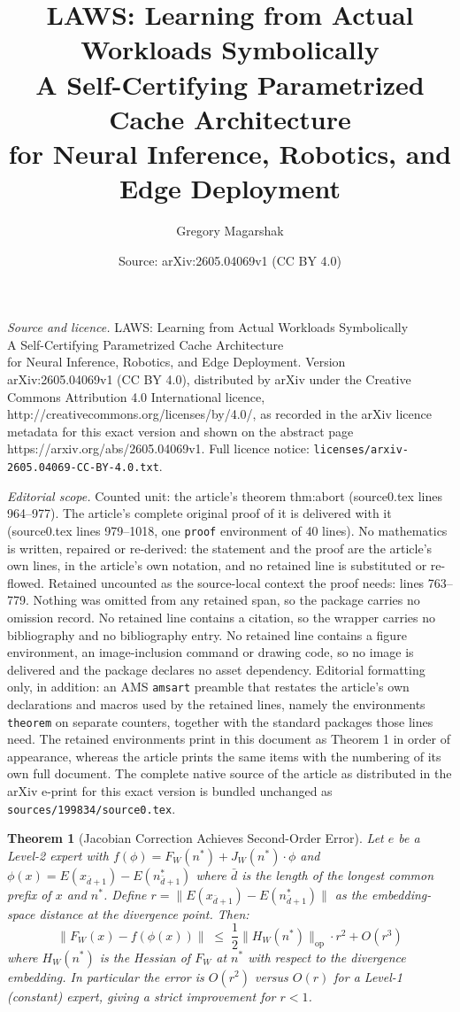 \documentclass[10pt,a4paper]{amsart}
\title{LAWS: Learning from Actual Workloads Symbolically\\ \large A Self-Certifying Parametrized Cache Architecture\\ for Neural Inference, Robotics, and Edge Deployment}
\author{Gregory Magarshak}
\date{Source: arXiv:2605.04069v1 (CC BY 4.0)}
\newtheorem{theorem}{Theorem}
\begin{document}
\maketitle

\noindent\emph{Source and licence.} LAWS: Learning from Actual Workloads Symbolically\\ \large A Self-Certifying Parametrized Cache Architecture\\ for Neural Inference, Robotics, and Edge Deployment. Version arXiv:2605.04069v1 (CC BY 4.0), distributed by arXiv under the Creative Commons Attribution 4.0 International licence, http://creativecommons.org/licenses/by/4.0/, as recorded in the arXiv licence metadata for this exact version and shown on the abstract page https://arxiv.org/abs/2605.04069v1. Full licence notice: \texttt{licenses/arxiv-2605.04069-CC-BY-4.0.txt}.\par\smallskip

\noindent\textit{Editorial scope.} Counted unit: the article's theorem thm:abort (source0.tex lines 964--977). The article's complete original proof of it is delivered with it (source0.tex lines 979--1018, one \texttt{proof} environment of 40 lines). No mathematics is written, repaired or re-derived: the statement and the proof are the article's own lines, in the article's own notation, and no retained line is substituted or re-flowed.  Retained uncounted as the source-local context the proof needs: lines 763--779.  Nothing was omitted from any retained span, so the package carries no omission record.  No retained line contains a citation, so the wrapper carries no bibliography and no bibliography entry.  No retained line contains a figure environment, an image-inclusion command or drawing code, so no image is delivered and the package declares no asset dependency.  Editorial formatting only, in addition: an AMS \texttt{amsart} preamble that restates the article's own declarations and macros used by the retained lines, namely the environments \texttt{theorem} on separate counters, together with the standard packages those lines need.  The retained environments print in this document as Theorem 1 in order of appearance, whereas the article prints the same items with the numbering of its own full document.  The complete native source of the article as distributed in the arXiv e-print for this exact version is bundled unchanged as \texttt{sources/199834/source0.tex}.
\begin{theorem}[Jacobian Correction Achieves Second-Order Error]
\label{thm:jacobian}
Let $e$ be a Level-2 expert with $f(\phi) = F_W(n^*) + J_W(n^*) \cdot \phi$
and $\phi(x) = E(x_{\bar{d}+1}) - E(n^*_{\bar{d}+1})$ where $\bar{d}$ is the
length of the longest common prefix of $x$ and $n^*$.  Define
$r = \|E(x_{\bar{d}+1}) - E(n^*_{\bar{d}+1})\|$ as the embedding-space distance
at the divergence point.  Then:
\[
  \|F_W(x) - f(\phi(x))\|
  \;\leq\;
  \frac{1}{2} \|H_W(n^*)\|_{\mathrm{op}} \cdot r^2
  + O(r^3)
\]
where $H_W(n^*)$ is the Hessian of $F_W$ at $n^*$ with respect to the divergence
embedding.  In particular the error is $O(r^2)$ versus $O(r)$ for a Level-1
(constant) expert, giving a strict improvement for $r < 1$.
\end{theorem}
\end{document}
